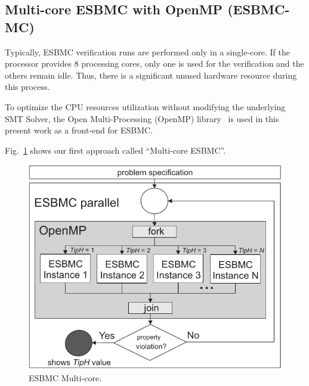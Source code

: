 \subsection{Multi-core ESBMC with OpenMP (ESBMC-MC)}
\label{Multi-core-ESBMC-with-OpenMP}

Typically, ESBMC verification runs are performed only in a single-core. If the processor provides $8$ processing cores, only one is used for the verification and the others remain idle. Thus, there is a significant unused hardware resource during this process. 


To optimize the CPU resources utilization without modifying the underlying SMT Solver, the Open Multi-Processing (OpenMP) library~\cite{Dagum1998} is used in this present work as a front-end for ESBMC.

Fig.~\ref{ESBMC-Multi-core} shows our first approach called ``Multi-core ESBMC''.
%
\begin{figure}[ht]
	\centering
  \includegraphics[scale=0.75]{Image/esbmc-parallel.pdf} 
	\caption{ESBMC Multi-core.}
	\label{ESBMC-Multi-core}
\end{figure}

